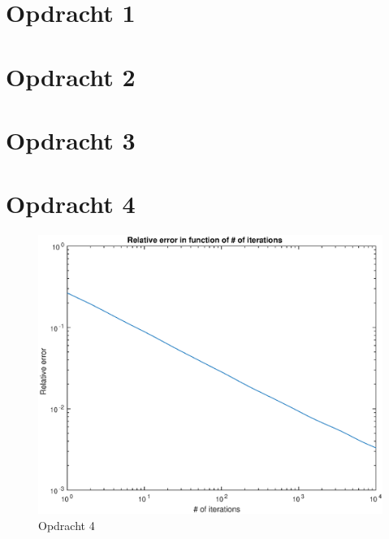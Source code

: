 \documentclass[11pt,a4paper]{article}
\begin{document}
\begin{titlepage}

\vfill %

\end{titlepage}

\section*{Opdracht 1}



\section*{Opdracht 2}



\section*{Opdracht 3}



\section*{Opdracht 4}

\begin{figure}[H]
\centering
\includegraphics[scale=0.55]{opdracht4}
\caption{Opdracht 4}
\end{figure}
\end{document}
